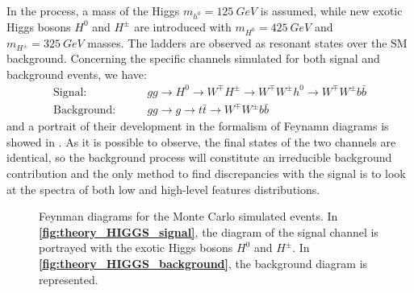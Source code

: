 \documentclass[../main/main.tex]{subfiles}
\begin{document}
In the process, a mass of the Higgs \( m_{h^{0}} = 125 \ \si{GeV} \) is assumed, while new exotic Higgs bosons \( H^{0} \) and \( H^{\pm} \) are introduced with \( m_{H^{0}} = 425 \ \si{GeV} \) and \( m_{H^{\pm}} = 325 \ \si{GeV} \) masses. The ladders are observed as resonant states over the SM background. Concerning the specific channels simulated for both signal and background events, we have:
\begin{align}
    \text{Signal:} \qquad&gg \to
        H^{0}
        \to
        W^{\mp} H^{\pm}
        \to
        W^{\mp} W^{\pm} h^{0}
        \to
        W^{\mp} W^{\pm} b \bar{b}
        \\
    \text{Background:} \qquad&gg \to
        g
        \to
        t \bar{t}
        \to
        W^{\mp} W^{\pm} b \bar{b}
\end{align}
and a portrait of their development in the formalism of Feynamn diagrams is showed in . As it is possible to observe, the final states of the two channels are identical, so the background process will constitute an irreducible background contribution and the only method to find discrepancies with the signal is to look at the spectra of both low and high-level features distributions.

\begin{figure}[!h]
    \begin{minipage}[c]{0.49\linewidth}
        \vspace{0pt}
        \centering
    \end{minipage}%
    \hfill%
    \begin{minipage}[c]{0.49\linewidth}
        \vspace{0pt}
        \centering
    \end{minipage}%
    \caption{Feynman diagrams for the Monte Carlo simulated events. In \textbf{\ref{fig:theory_HIGGS_signal}}, the diagram of the signal channel is portrayed with the exotic Higgs bosons \( H^{0} \) and \( H^{\pm} \). In \textbf{\ref{fig:theory_HIGGS_background}}, the background diagram is represented.}
    \label{fig:theory_HIGGS_feynman}
\end{figure}

\newcommand\brabarb{\scalebox{.3}{(}\raisebox{-1.7pt}[0pt][0pt]{$-$}\scalebox{.3}{)}}
\end{document}

